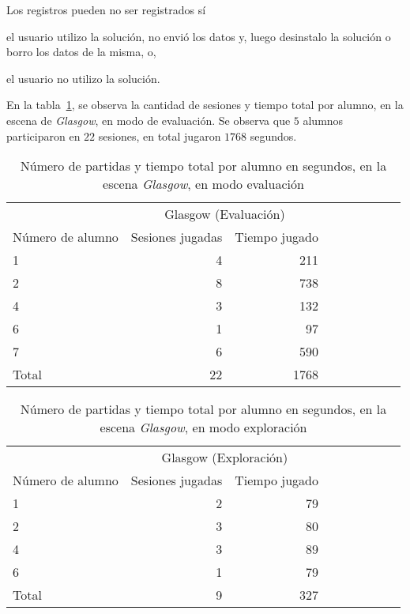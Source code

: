 Los registros pueden no ser registrados sí
\begin{enumerate*}[label=\itshape\alph*\upshape)]
    \item el usuario utilizo la solución, no envió los datos y, luego
        desinstalo la solución o borro los datos de la misma, o,
    \item el usuario no utilizo la solución.
\end{enumerate*}

En la tabla~\ref{tab:log_glasgow_random_partida}, se observa la cantidad de
sesiones y tiempo total por alumno, en la escena de \textit{Glasgow}, en modo de
evaluación. Se observa que $5$ alumnos participaron en $22$ sesiones, en total
jugaron $1768$ segundos.

\begin{table}[H]
\centering
\begin{tabular}{lrrrrrrrr}
\toprule
& \multicolumn{2}{c}{Glasgow (Evaluación)} \\
                   \cmidrule(lr){2-3} 
Número de alumno   & Sesiones jugadas                            & Tiempo jugado \\
\midrule
1     & 4  & 211 \\
2     & 8  & 738 \\
4     & 3  & 132 \\
6     & 1  & 97  \\
7     & 6  & 590 \\
\midrule
Total & 22 & 1768 \\
\bottomrule
\end{tabular}
\caption{Número de partidas y tiempo total por alumno en segundos, en la escena
    \textit{Glasgow}, en modo evaluación}
\label{tab:log_glasgow_random_partida}
\end{table}


\begin{table}[H]
\centering
\begin{tabular}{lrrrrrrrr}
\toprule
& \multicolumn{2}{c}{Glasgow (Exploración)} \\
                   \cmidrule(lr){2-3} 
Número de alumno   & Sesiones jugadas                            & Tiempo jugado \\
\midrule
1        & 2 & 79 \\
2        & 3 & 80 \\
4        & 3 & 89 \\
6        & 1 & 79 \\
\midrule
Total   & 9 & 327 \\
\bottomrule
\end{tabular}
\caption{Número de partidas y tiempo total por alumno en segundos, en la escena
    \textit{Glasgow}, en modo exploración}
\label{tab:log_glasgow_custom_partida}
\end{table}


